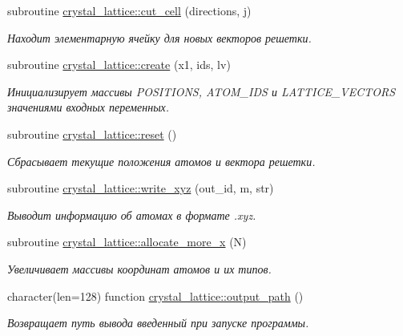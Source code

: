 \begin{DoxyCompactItemize}
subroutine \mbox{\hyperlink{namespacecrystal__lattice_a71eb47087ef35ee8f513ae7eaf422375}{crystal\+\_\+lattice\+::cut\+\_\+cell}} (directions, j)
\begin{DoxyCompactList}\small\item\em Находит элементарную ячейку для новых векторов решетки. \end{DoxyCompactList}\item 
subroutine \mbox{\hyperlink{namespacecrystal__lattice_ad70644846195cc9116b59bbc5c0c486b}{crystal\+\_\+lattice\+::create}} (x1, ids, lv)
\begin{DoxyCompactList}\small\item\em Инициализирует массивы P\+O\+S\+I\+T\+I\+O\+NS, A\+T\+O\+M\+\_\+\+I\+DS и L\+A\+T\+T\+I\+C\+E\+\_\+\+V\+E\+C\+T\+O\+RS значениями входных переменных. \end{DoxyCompactList}\item 
subroutine \mbox{\hyperlink{namespacecrystal__lattice_afc4857a08f0790bdfceb31fad36a474a}{crystal\+\_\+lattice\+::reset}} ()
\begin{DoxyCompactList}\small\item\em Сбрасывает текущие положения атомов и вектора решетки. \end{DoxyCompactList}\item 
subroutine \mbox{\hyperlink{namespacecrystal__lattice_a973f0596d4738cf20ad408cc7551a1c9}{crystal\+\_\+lattice\+::write\+\_\+xyz}} (out\+\_\+id, m, str)
\begin{DoxyCompactList}\small\item\em Выводит информацию об атомах в формате .xyz. \end{DoxyCompactList}\item 
subroutine \mbox{\hyperlink{namespacecrystal__lattice_a1943406cbde95385437fac84197f9426}{crystal\+\_\+lattice\+::allocate\+\_\+more\+\_\+x}} (N)
\begin{DoxyCompactList}\small\item\em Увеличивает массивы координат атомов и их типов. \end{DoxyCompactList}\item 
character(len=128) function \mbox{\hyperlink{namespacecrystal__lattice_ae9bc1e02bee4558ba4964ecae4c8ab3e}{crystal\+\_\+lattice\+::output\+\_\+path}} ()
\begin{DoxyCompactList}\small\item\em Возвращает путь вывода введенный при запуске программы. \end{DoxyCompactList}\end{DoxyCompactItemize}
